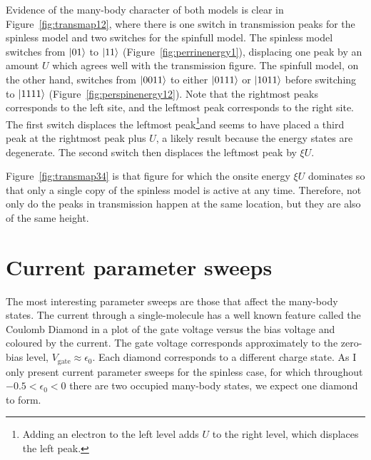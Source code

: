 Evidence of the many-body character of both models is clear in Figure~\ref{fig:transmap12}, where there is one switch in transmission peaks for the spinless model and two switches for the spinfull model. The spinless model switches from $\ket{01}$ to $\ket{11}$ (Figure~\ref{fig:perrinenergy1}), displacing one peak by an amount $U$ which agrees well with the transmission figure.  The spinfull model, on the other hand, switches from $\ket{0011}$ to either $\ket{0111}$ or $\ket{1011}$ before switching to $\ket{1111}$ (Figure~\ref{fig:perspinenergy12}). Note that the rightmost peaks corresponds to the left site, and the leftmost peak corresponds to the right site. The first switch displaces the leftmost peak\footnote{Adding an electron to the left level adds $U$ to the right level, which displaces the left peak.}and seems to have placed a third peak at the rightmost peak plus $U$, a likely result because the energy states are degenerate. The second switch then displaces the leftmost peak by $\xi U$. 
 
Figure~\ref{fig:transmap34} is that figure for which the onsite energy $\xi U$ dominates so that only a single copy of the spinless model is active at any time. Therefore, not only do the peaks in transmission happen at the same location, but they are also of the same height.
\section{Current parameter sweeps}
\label{sec:twositeparamsweep}
The most interesting parameter sweeps are those that affect the many-body states. The current through a single-molecule has a well known feature called the Coulomb Diamond \cite{seldenthuis, perrin} in a plot of the gate voltage versus the bias voltage and coloured by the current. The gate voltage corresponds approximately to the zero-bias level, $V_\text{gate} \approx \epsilon_0$. Each diamond corresponds to a different charge state. As I only present current parameter sweeps for the spinless case, for which throughout $-0.5 < \epsilon_0 < 0$ there are two occupied many-body states, we expect one diamond to form.  

